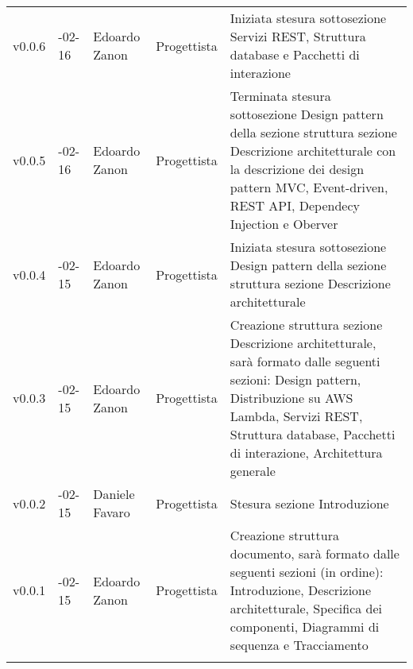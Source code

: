 \begin{longtable} { >{\centering}p{1.4cm} >{\centering}p{2cm} >{\centering}p{2.3cm} >{\centering}p{2.7cm} p{5.5cm} }
	\addlinespace[0.4em]
	\midrule
	\addlinespace[0.4em]
	v0.0.6 & 2017-02-16 &  Edoardo Zanon & Progettista & Iniziata stesura sottosezione Servizi REST, Struttura database e Pacchetti di interazione  \\
	\addlinespace[0.4em]
	\midrule
	\addlinespace[0.4em]
	v0.0.5 & 2017-02-16 &  Edoardo Zanon & Progettista & Terminata stesura sottosezione Design pattern della sezione struttura sezione Descrizione architetturale con la descrizione dei design pattern MVC, Event-driven, REST API, Dependecy Injection e Oberver  \\
	\addlinespace[0.4em]
	\midrule
	\addlinespace[0.4em]
	v0.0.4 & 2017-02-15 &  Edoardo Zanon & Progettista & Iniziata stesura sottosezione Design pattern della sezione struttura sezione Descrizione architetturale  \\
	\addlinespace[0.4em]
	\midrule
	\addlinespace[0.4em]
	v0.0.3 & 2017-02-15 &  Edoardo Zanon & Progettista & Creazione struttura sezione Descrizione architetturale, sarà formato dalle seguenti sezioni: Design pattern, Distribuzione su AWS Lambda, Servizi REST, Struttura database, Pacchetti di interazione, Architettura generale  \\
	\addlinespace[0.4em]
	\midrule
	\addlinespace[0.4em]
	v0.0.2 & 2017-02-15 &  Daniele Favaro & Progettista & Stesura sezione Introduzione  \\
	\addlinespace[0.4em]
	\midrule
	\addlinespace[0.4em]
	v0.0.1 & 2017-02-15 &  Edoardo Zanon & Progettista & Creazione struttura documento, sarà formato dalle seguenti sezioni (in ordine): Introduzione, Descrizione architetturale, Specifica dei componenti, Diagrammi di sequenza e Tracciamento  \\
	\arrayrulecolor{black}
	\addlinespace[0.5em]
	\bottomrule
\end{longtable}
